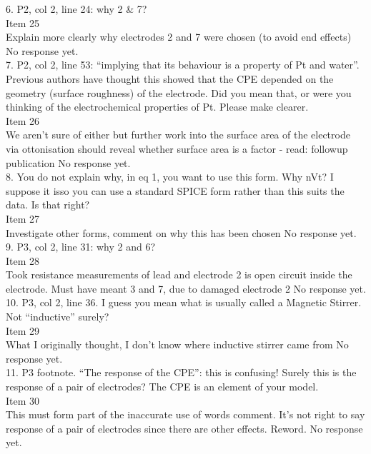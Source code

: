 \documentclass[journal, a4paper]{IEEEtran}
\begin{document}
{6. P2, col 2, line 24: why 2 & 7?\\
{\color{OliveGreen}
    Item 25\\
    {\color{Red} Explain more clearly why electrodes 2 and 7 were chosen (to avoid end effects)}
    No response yet.
}\\

7. P2, col 2, line 53: ``implying that its behaviour is a property of Pt and water''. Previous authors have thought this showed that the CPE depended on the geometry (surface roughness) of the electrode. Did you mean that, or were you thinking of the electrochemical properties of Pt. Please make clearer.\\
{\color{OliveGreen}
    Item 26\\
    {\color{Red} We aren't sure of either but further work into the surface area of the electrode via ottonisation should reveal whether surface area is a factor - read: followup publication}
    No response yet.
}\\

8. You do not explain why, in eq 1, you want to use this form. Why nVt? I suppose it isso you can use a standard SPICE form rather than this suits the data. Is that right?\\
{\color{OliveGreen} 
    Item 27\\
    {\color{Red} Investigate other forms, comment on why this has been chosen}
    No response yet.
}\\

9. P3, col 2, line 31: why 2 and 6?\\
{\color{OliveGreen}
    Item 28\\
    {\color{Red} Took resistance measurements of lead and electrode 2 is open circuit inside the electrode. Must have meant 3 and 7, due to damaged electrode 2}
    No response yet.
}\\

10. P3, col 2, line 36. I guess you mean what is usually called a Magnetic Stirrer. Not ``inductive'' surely?\\
{\color{OliveGreen} 
    Item 29\\
    {\color{Red} What I originally thought, I don't know where inductive stirrer came from}
    No response yet.
}\\

11. P3 footnote. ``The response of the CPE'': this is confusing! Surely this is the response of a pair of electrodes? The CPE is an element of your model.\\
{\color{OliveGreen} 
    Item 30\\
    {\color{Red} This must form part of the inaccurate use of words comment. It's not right to say response of a pair of electrodes since there are other effects. Reword.}
    No response yet.
}\\

}
\end{document}
